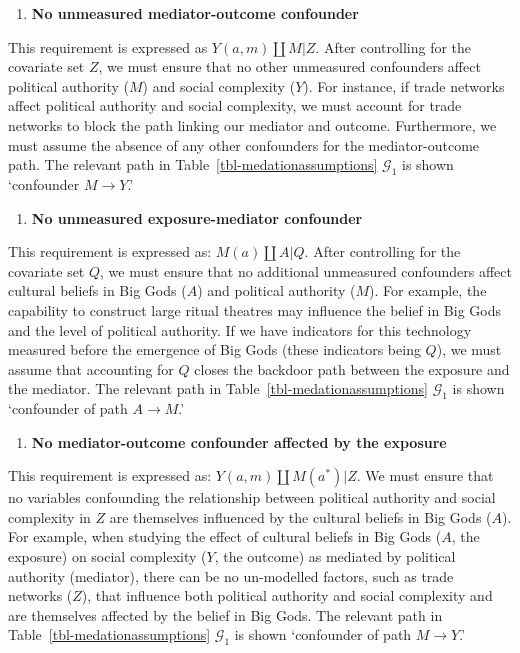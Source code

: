 \documentclass[
  single column]{article}
\providecommand{\tightlist}{%
  \setlength{\itemsep}{0pt}\setlength{\parskip}{0pt}}\usepackage{longtable,booktabs,array}
\begin{document}
\begin{enumerate}
\def\labelenumi{\arabic{enumi}.}
\setcounter{enumi}{1}
\tightlist
\item
  \textbf{No unmeasured mediator-outcome confounder}
\end{enumerate}

This requirement is expressed as \(Y(a,m) \coprod M | Z\). After
controlling for the covariate set \(Z\), we must ensure that no other
unmeasured confounders affect political authority (\(M\)) and social
complexity (\(Y\)). For instance, if trade networks affect political
authority and social complexity, we must account for trade networks to
block the path linking our mediator and outcome. Furthermore, we must
assume the absence of any other confounders for the mediator-outcome
path. The relevant path in Table~\ref{tbl-medationassumptions}
\(\mathcal{G}_1\) is shown `confounder \(M \to Y\).'

\begin{enumerate}
\def\labelenumi{\arabic{enumi}.}
\setcounter{enumi}{2}
\tightlist
\item
  \textbf{No unmeasured exposure-mediator confounder}
\end{enumerate}

This requirement is expressed as: \(M(a) \coprod A | Q\). After
controlling for the covariate set \(Q\), we must ensure that no
additional unmeasured confounders affect cultural beliefs in Big Gods
(\(A\)) and political authority (\(M\)). For example, the capability to
construct large ritual theatres may influence the belief in Big Gods and
the level of political authority. If we have indicators for this
technology measured before the emergence of Big Gods (these indicators
being \(Q\)), we must assume that accounting for \(Q\) closes the
backdoor path between the exposure and the mediator. The relevant path
in Table~\ref{tbl-medationassumptions} \(\mathcal{G}_1\) is shown
`confounder of path \(A \to M\).'

\begin{enumerate}
\def\labelenumi{\arabic{enumi}.}
\setcounter{enumi}{3}
\tightlist
\item
  \textbf{No mediator-outcome confounder affected by the exposure}
\end{enumerate}

This requirement is expressed as: \(Y(a,m) \coprod M(a^*) | Z\). We must
ensure that no variables confounding the relationship between political
authority and social complexity in \(Z\) are themselves influenced by
the cultural beliefs in Big Gods (\(A\)). For example, when studying the
effect of cultural beliefs in Big Gods (\(A\), the exposure) on social
complexity (\(Y\), the outcome) as mediated by political authority
(mediator), there can be no un-modelled factors, such as trade networks
(\(Z\)), that influence both political authority and social complexity
and are themselves affected by the belief in Big Gods. The relevant path
in Table~\ref{tbl-medationassumptions} \(\mathcal{G}_1\) is shown
`confounder of path \(M \to Y\).'
\end{document}
